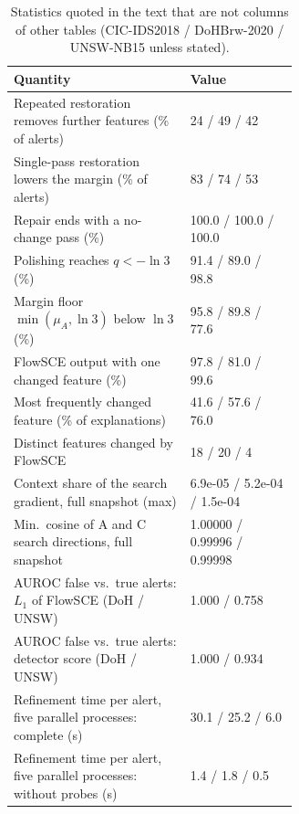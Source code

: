 \begin{table}[t]
\centering\footnotesize
\caption{Statistics quoted in the text that are not columns of other tables (CIC-IDS2018 / DoHBrw-2020 / UNSW-NB15 unless stated).}
\label{tab:a-stats}
\begin{tabular}{@{}p{0.62\linewidth}l@{}}
\toprule
Quantity & Value \\
\midrule
Repeated restoration removes further features (\% of alerts) & 24 / 49 / 42 \\
Single-pass restoration lowers the margin (\% of alerts) & 83 / 74 / 53 \\
Repair ends with a no-change pass (\%) & 100.0 / 100.0 / 100.0 \\
Polishing reaches $q<-\ln3$ (\%) & 91.4 / 89.0 / 98.8 \\
Margin floor $\min(\mu_A,\ln3)$ below $\ln3$ (\%) & 95.8 / 89.8 / 77.6 \\
FlowSCE output with one changed feature (\%) & 97.8 / 81.0 / 99.6 \\
Most frequently changed feature (\% of explanations) & 41.6 / 57.6 / 76.0 \\
Distinct features changed by FlowSCE & 18 / 20 / 4 \\
Context share of the search gradient, full snapshot (max) & 6.9e-05 / 5.2e-04 / 1.5e-04 \\
Min.\ cosine of A and C search directions, full snapshot & 1.00000 / 0.99996 / 0.99998 \\
AUROC false vs.\ true alerts: $L_1$ of FlowSCE (DoH / UNSW) & 1.000 / 0.758 \\
AUROC false vs.\ true alerts: detector score (DoH / UNSW) & 1.000 / 0.934 \\
Refinement time per alert, five parallel processes: complete (s) & 30.1 / 25.2 / 6.0 \\
Refinement time per alert, five parallel processes: without probes (s) & 1.4 / 1.8 / 0.5 \\
\bottomrule
\end{tabular}
\end{table}
